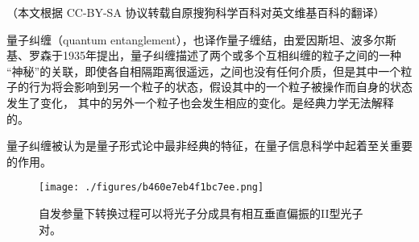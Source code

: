 
（本文根据 CC-BY-SA 协议转载自原搜狗科学百科对英文维基百科的翻译）

量子纠缠（quantum entanglement），也译作量子缠结，由爱因斯坦、波多尔斯基、罗森于1935年提出，量子纠缠描述了两个或多个互相纠缠的粒子之间的一种 “神秘”的关联，即使各自相隔距离很遥远，之间也没有任何介质，但是其中一个粒子的行为将会影响到另一个粒子的状态，假设其中的一个粒子被操作而自身的状态发生了变化， 其中的另外一个粒子也会发生相应的变化。是经典力学无法解释的。

量子纠缠被认为是量子形式论中最非经典的特征，在量子信息科学中起着至关重要的作用。

\begin{figure}[ht]
\centering
\texttt{[image: ./figures/b460e7eb4f1bc7ee.png]}
\caption{自发参量下转换过程可以将光子分成具有相互垂直偏振的II型光子对。} \label{fig_LZJC_1}
\end{figure}

